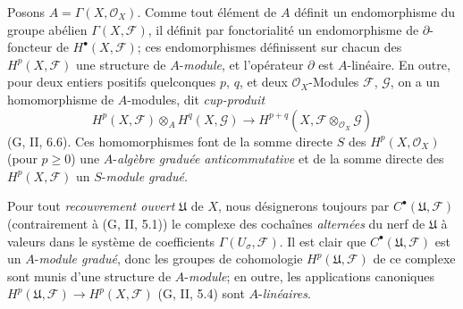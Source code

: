 \begin{env}[12.1.2]
\label{0.12.1.2-fr}
Posons $A=\Gamma(X,\mathcal O_X)$. Comme tout élément de $A$ définit un
endomorphisme du groupe abélien $\Gamma(X,\mathcal F)$, il définit par
fonctorialité un endomorphisme de $\partial$-foncteur de
$H^\bullet(X,\mathcal F)$; ces endomorphismes définissent sur chacun des
$H^p(X,\mathcal F)$ une structure de $A$-\emph{module}, et l'opérateur $\partial$
est $A$-linéaire. En outre, pour deux entiers positifs quelconques $p$, $q$,
et deux $\mathcal O_X$-Modules $\mathcal F$, $\mathcal G$, on a un
homomorphisme de $A$-modules, dit \emph{cup-produit}
\[
\label{0.12.1.2.1-fr}
\tag{12.1.2.1}
H^p(X,\mathcal F)\otimes_A H^q(X,\mathcal G)
\longrightarrow H^{p+q}(X,\mathcal F\otimes_{\mathcal O_X}\mathcal G)
\]
(G, II, 6.6). Ces homomorphismes font de la somme directe $S$ des
$H^p(X,\mathcal O_X)$ (pour $p\geq0$) une $A$-\emph{algèbre graduée
anticommutative} et de la somme directe des $H^p(X,\mathcal F)$ un $S$-\emph{module
gradué}.

Pour tout \emph{recouvrement ouvert} $\mathfrak U$ de $X$, nous désignerons
toujours par $C^\bullet(\mathfrak U,\mathcal F)$ (contrairement à
(G, II, 5.1)) le complexe des cochaînes \emph{alternées} du nerf de
$\mathfrak U$ à valeurs dans le système de coefficients
$\Gamma(U_\sigma,\mathcal F)$. Il est clair que
$C^\bullet(\mathfrak U,\mathcal F)$ est un $A$-\emph{module gradué}, donc les
groupes de cohomologie $H^p(\mathfrak U,\mathcal F)$ de ce complexe
sont munis d'une structure de $A$-\emph{module}; en outre, les applications
canoniques
$H^p(\mathfrak U,\mathcal F)\to H^p(X,\mathcal F)$
(G, II, 5.4) sont $A$-\emph{linéaires}.
\end{env}

